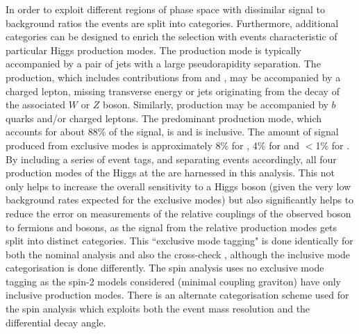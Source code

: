 In order to exploit different regions of phase space with dissimilar signal to background ratios the events are split into categories. Furthermore, additional categories can be designed to enrich the selection with events characteristic of particular Higgs production modes. The \VBF production mode is typically accompanied by a pair of jets with a large pseudorapidity separation. The \VH production, which includes contributions from \WH and \ZH, may be accompanied by a charged lepton, missing transverse energy or jets originating from the decay of the associated $W$ or $Z$ boson. Similarly, \ttH production may be accompanied by $b$ quarks and/or charged leptons. The predominant production mode, which accounts for about 88\% of the signal, is \ggH and is inclusive. The amount of signal produced from exclusive modes is approximately 8\% for \VBF, 4\% for \VH and $<$1\% for \ttH. By including a series of event tags, and separating events accordingly, all four production modes of the Higgs at the \LHC are harnessed in this analysis. This not only helps to increase the overall sensitivity to a \SM Higgs boson (given the very low background rates expected for the exclusive modes) but also significantly helps to reduce the error on measurements of the relative couplings of the observed boson to fermions and bosons, as the signal from the relative production modes gets split into distinct categories. This ``exclusive mode tagging" is done identically for both the nominal \MFM analysis and also the cross-check \SMVA, although the inclusive mode categorisation is done differently. The \CiC spin analysis uses no exclusive mode tagging as the spin-2 models considered (minimal coupling graviton) have only inclusive production modes. There is an alternate categorisation scheme used for the spin analysis which exploits both the event mass resolution and the differential decay angle. 

